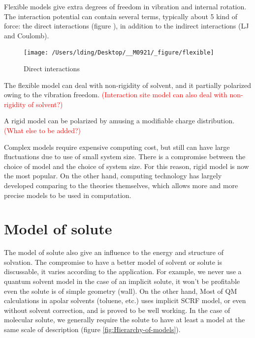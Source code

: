 Flexible models give extra degrees of freedom in vibration and internal
rotation. The interaction potential can contain several terms, typically
about 5 kind of force: the direct interactions (figure ), in addition
to the indirect interactions (LJ and Coulomb).

\begin{figure}[h]
\begin{centering}
\texttt{[image: /Users/lding/Desktop/\_\_M0921/\_figure/flexible]}
\par\end{centering}

\caption{Direct interactions}
\end{figure}


The flexible model can deal with non-rigidity of solvent, and it partially
polarized owing to the vibration freedom. \textcolor{red}{(Interaction
site model can also deal with non-rigidity of solvent?)}

A rigid model can be polarized by amusing a modifiable charge distribution.
\textcolor{red}{(What else to be added?)}

Complex models require expensive computing cost, but still can have
large fluctuations due to use of small system size. There is a compromise
between the choice of model and the choice of system size. For this
reason, rigid model is now the most popular. On the other hand, computing
technology has largely developed comparing to the theories themselves,
which allows more and more precise models to be used in computation. 


\section{Model of solute}

The model of solute also give an influence to the energy and structure
of solvation. The compromise to have a better model of solvent or
solute is discussable, it varies according to the application. For
example, we never use a quantum solvent model in the case of an implicit
solute, it won't be profitable even the solute is of simple geometry
(wall). On the other hand, Most of \acs{QM} calculations in apolar
solvents (toluene, etc.) uses implicit SCRF model, or even without
solvent correction, and is proved to be well working. In the case
of molecular solute, we generally require the solute to have at least
a model at the same scale of description (figure \ref{fig:Hierarchy-of-models}).

